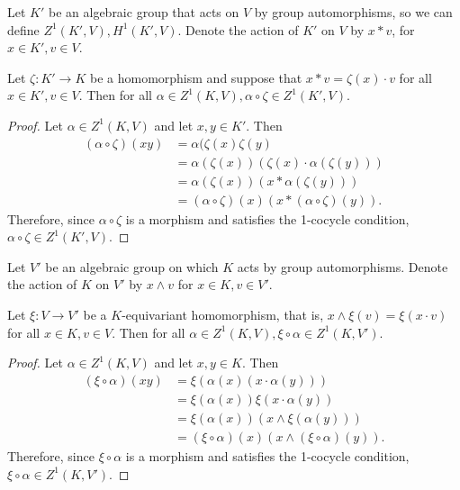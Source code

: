 \begin{lemma} \label{zeta}
	Let $K'$ be an algebraic group that acts on $V$ by group automorphisms, so we can define $Z^1(K', V), H^1(K', V)$. Denote the action of $K'$ on $V$ by $x \ast v$, for $x \in K', v \in V$.

	Let $\zeta:K'\rightarrow K$ be a homomorphism and suppose that $x \ast v = \zeta(x) \cdot v$ for all $x \in K', v \in V$. Then for all $\alpha \in Z^1(K, V), \alpha \circ \zeta \in Z^1(K', V)$.
\end{lemma}
\begin{proof}
	Let $\alpha \in Z^1(K, V)$ and let $x, y \in K'$. Then
	\begin{align*}
		(\alpha \circ \zeta)(xy) &= \alpha(\zeta(x)\zeta(y) \\
			&= \alpha(\zeta(x))\left(\zeta(x) \cdot \alpha(\zeta(y))\right) \\
			&= \alpha(\zeta(x))\left(x \ast \alpha(\zeta(y))\right) \\
			&= (\alpha \circ \zeta)(x)\left(x \ast (\alpha \circ \zeta)(y)\right).
	\end{align*}
	Therefore, since $\alpha \circ \zeta$ is a morphism and satisfies the 1-cocycle condition, $\alpha \circ \zeta \in Z^1(K', V)$.
\end{proof}

\begin{lemma} \label{xi}
	Let $V'$ be an algebraic group on which $K$ acts by group automorphisms. Denote the action of $K$ on $V'$ by $x \wedge v$ for $x \in K, v \in V'$.

	Let $\xi: V \rightarrow V'$ be a $K$-equivariant homomorphism, that is, $x \wedge \xi(v) = \xi(x \cdot v)$ for all $x \in K, v \in V$. Then for all $\alpha \in Z^1(K, V), \xi \circ \alpha \in Z^1(K, V')$.
\end{lemma}
\begin{proof}
	Let $\alpha \in Z^1(K, V)$ and let $x, y \in K$. Then
	\begin{align*}
		(\xi \circ \alpha)(xy) &= \xi\left(\alpha(x)(x \cdot \alpha(y))\right) \\
			&= \xi(\alpha(x))\xi(x \cdot \alpha(y)) \\
			&= \xi(\alpha(x))\left(x \wedge \xi(\alpha(y))\right) \\
			&= (\xi \circ \alpha)(x)\left(x \wedge (\xi \circ \alpha)(y)\right).
	\end{align*}
	Therefore, since $\xi \circ \alpha$ is a morphism and satisfies the 1-cocycle condition, $\xi \circ \alpha \in Z^1(K, V')$.
\end{proof}

